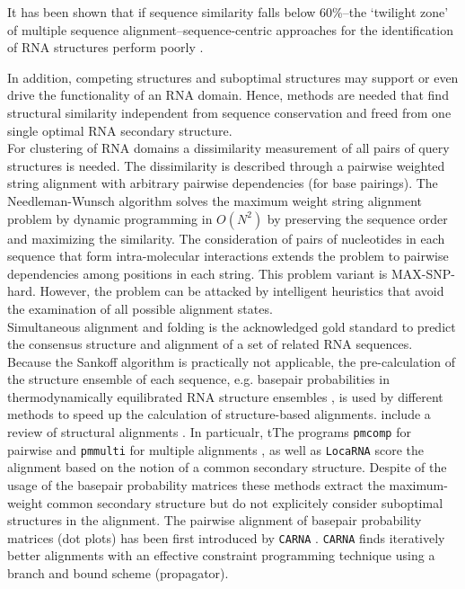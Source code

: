 \documentclass[a4paper,11pt]{article}
\newcommand\pmcomp{\texttt{pmcomp}}
\newcommand\pmmulti{\texttt{pmmulti}}
\newcommand\locarna{\texttt{LocaRNA}}
\newcommand\carna{\texttt{CARNA}}
\begin{document}
It has been shown that if sequence similarity falls below 60\%--the 
`twilight zone' of multiple sequence alignment--sequence-centric approaches 
for the identification of RNA structures perform poorly  \cite{Gardner15860779}. 

In addition, competing structures and
suboptimal structures may support or even drive the functionality of an RNA
domain. Hence, methods are needed that find structural similarity independent
from sequence conservation and freed from one single optimal RNA secondary
structure.\\

For clustering of RNA domains a dissimilarity measurement of all pairs of query
structures is needed. The dissimilarity is described through a pairwise weighted
string alignment with arbitrary pairwise dependencies (for base pairings). The
Needleman-Wunsch algorithm solves the maximum weight string alignment
problem by dynamic programming in $O(N^2)$ by preserving the sequence order and
maximizing the similarity. The consideration of pairs of nucleotides in each
sequence that form intra-molecular interactions extends the problem to pairwise
dependencies among positions in each string. This problem variant is
MAX-SNP-hard. However, the problem can be attacked by intelligent heuristics
that avoid the examination of all possible alignment states.\\

Simultaneous alignment and folding \cite{sankoff85} is the acknowledged gold
standard to predict the consensus structure and alignment of a set of related
RNA sequences. Because the Sankoff algorithm is practically not applicable, the
pre-calculation of the structure ensemble of each sequence, e.g. basepair
probabilities in thermodynamically equilibrated RNA structure ensembles
\cite{McCaskill:1990}, is used by different methods to speed up the calculation
of structure-based alignments. {\color{red} include a review of structural alignments }. In particualr, tThe programs \pmcomp{} for pairwise and
\pmmulti{} for multiple alignments \cite{Hofacker15073017}, as well as
\locarna{} \cite{Will17432929} score the alignment based on the notion of a
common secondary structure. Despite of the usage of the basepair probability
matrices these methods extract the maximum-weight common secondary structure but
do not explicitely consider suboptimal structures in the alignment. The pairwise
alignment of basepair probability matrices (dot plots) has been first introduced
by \carna{} \cite{Palu2010,Sorescu2012}. \carna{} finds iteratively better
alignments with an effective constraint programming technique using a branch and
bound scheme (propagator).\\
\end{document}
